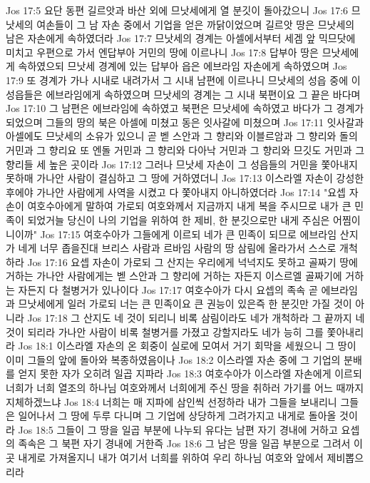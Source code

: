 Jos 17:5  요단 동편 길르앗과 바산 외에 므낫세에게 열 분깃이 돌아갔으니
Jos 17:6  므낫세의 여손들이 그 남 자손 중에서 기업을 얻은 까닭이었으며 길르앗 땅은 므낫세의 남은 자손에게 속하였더라
Jos 17:7  므낫세의 경계는 아셀에서부터 세겜 앞 믹므닷에 미치고 우편으로 가서 엔답부아 거민의 땅에 이르나니
Jos 17:8  답부아 땅은 므낫세에게 속하였으되 므낫세 경계에 있는 답부아 읍은 에브라임 자손에게 속하였으며
Jos 17:9  또 경계가 가나 시내로 내려가서 그 시내 남편에 이르나니 므낫세의 성읍 중에 이 성읍들은 에브라임에게 속하였으며 므낫세의 경계는 그 시내 북편이요 그 끝은 바다며
Jos 17:10  그 남편은 에브라임에 속하였고 북편은 므낫세에 속하였고 바다가 그 경계가 되었으며 그들의 땅의 북은 아셀에 미쳤고 동은 잇사갈에 미쳤으며
Jos 17:11  잇사갈과 아셀에도 므낫세의 소유가 있으니 곧 벧 스안과 그 향리와 이블르암과 그 향리와 돌의 거민과 그 향리요 또 엔돌 거민과 그 향리와 다아낙 거민과 그 향리와 므깃도 거민과 그 향리들 세 높은 곳이라
Jos 17:12  그러나 므낫세 자손이 그 성읍들의 거민을 쫓아내지 못하매 가나안 사람이 결심하고 그 땅에 거하였더니
Jos 17:13  이스라엘 자손이 강성한 후에야 가나안 사람에게 사역을 시켰고 다 쫓아내지 아니하였더라
Jos 17:14  "요셉 자손이 여호수아에게 말하여 가로되 여호와께서 지금까지 내게 복을 주시므로 내가 큰 민족이 되었거늘 당신이 나의 기업을 위하여 한 제비, 한 분깃으로만 내게 주심은 어찜이니이까"
Jos 17:15  여호수아가 그들에게 이르되 네가 큰 민족이 되므로 에브라임 산지가 네게 너무 좁을진대 브리스 사람과 르바임 사람의 땅 삼림에 올라가서 스스로 개척하라
Jos 17:16  요셉 자손이 가로되 그 산지는 우리에게 넉넉지도 못하고 골짜기 땅에 거하는 가나안 사람에게는 벧 스안과 그 향리에 거하는 자든지 이스르엘 골짜기에 거하는 자든지 다 철병거가 있나이다
Jos 17:17  여호수아가 다시 요셉의 족속 곧 에브라임과 므낫세에게 일러 가로되 너는 큰 민족이요 큰 권능이 있은즉 한 분깃만 가질 것이 아니라
Jos 17:18  그 산지도 네 것이 되리니 비록 삼림이라도 네가 개척하라 그 끝까지 네 것이 되리라 가나안 사람이 비록 철병거를 가졌고 강할지라도 네가 능히 그를 쫓아내리라
Jos 18:1  이스라엘 자손의 온 회중이 실로에 모여서 거기 회막을 세웠으니 그 땅이 이미 그들의 앞에 돌아와 복종하였음이나
Jos 18:2  이스라엘 자손 중에 그 기업의 분배를 얻지 못한 자가 오히려 일곱 지파라
Jos 18:3  여호수아가 이스라엘 자손에게 이르되 너희가 너희 열조의 하나님 여호와께서 너희에게 주신 땅을 취하러 가기를 어느 때까지 지체하겠느냐
Jos 18:4  너희는 매 지파에 삼인씩 선정하라 내가 그들을 보내리니 그들은 일어나서 그 땅에 두루 다니며 그 기업에 상당하게 그려가지고 내게로 돌아올 것이라
Jos 18:5  그들이 그 땅을 일곱 부분에 나누되 유다는 남편 자기 경내에 거하고 요셉의 족속은 그 북편 자기 경내에 거한즉
Jos 18:6  그 남은 땅을 일곱 부분으로 그려서 이곳 내게로 가져올지니 내가 여기서 너희를 위하여 우리 하나님 여호와 앞에서 제비뽑으리라
